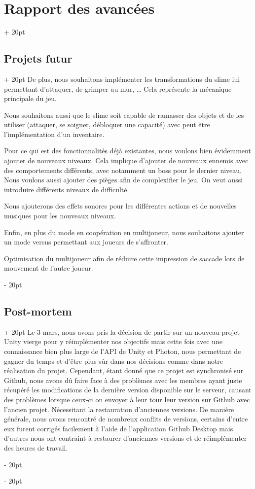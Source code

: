 \documentclass[a4paper, 12pt, twoside]{article}
\newcommand{\ind}[1][20pt]{\advance\leftskip + #1}
\newcommand{\deind}[1][20pt]{\advance\leftskip - #1}
\newenvironment{indt}[2][20pt]{#2 \par \ind[#1]}{\par \deind} %
\begin{document}
\begin{indt}{\section{Rapport des avancées}}
\begin{indt}{\subsection{Projets futur}}
            De plus, nous souhaitons implémenter les transformations du slime lui permettant d'attaquer, de grimper au mur, … Cela représente la mécanique principale du jeu.
            
            Nous souhaitons aussi que le slime soit capable de ramasser des objets et de les utiliser (attaquer, se soigner, débloquer une capacité) avec peut être l'implémentation d'un inventaire.
            
            Pour ce qui est des fonctionnalités déjà existantes, nous voulons bien évidemment ajouter de nouveaux niveaux. Cela implique d'ajouter de nouveaux ennemis avec des comportements différents, avec notamment un boss pour le dernier niveau. Nous voulons aussi ajouter des pièges afin de complexifier le jeu. On veut aussi introduire différents niveaux de difficulté.
            
            Nous ajouterons des effets sonores pour les différentes actions et de nouvelles musiques pour les nouveaux niveaux.
            
            Enfin, en plus du mode en coopération en multijoueur, nous souhaitons ajouter un mode versus permettant aux joueurs de s'affronter.
            
            Optimisation du multijoueur afin de réduire cette impression de saccade lors de mouvement de l'autre joueur.
            
        \end{indt}

        \begin{indt}{\subsection{Post-mortem}}
            Le 3 mars, nous avons pris la décision de partir sur un nouveau projet Unity vierge pour y réimplémenter nos objectifs mais cette fois avec une connaissance bien plus large de l'API de Unity et Photon, nous permettant de gagner du temps et d'être plus sûr dans nos décisions comme dans notre réalisation du projet. Cependant, étant donné que ce projet est synchronisé sur Github, nous avons dû faire face à des problèmes avec les membres ayant juste récupéré les modifications de la dernière version disponible sur le serveur, causant des problèmes lorsque ceux-ci on envoyer à leur tour leur version sur Github avec l'ancien projet. Nécessitant la restauration d'anciennes versions. De manière générale, nous avons rencontré de nombreux conflits de versions, certains d'entre eux furent corrigés facilement à l'aide de l'application Github Desktop mais d'autres nous ont contraint à restaurer d'anciennes versions et de réimplémenter des heures de travail.


\end{indt}
\end{indt}
\end{document}
